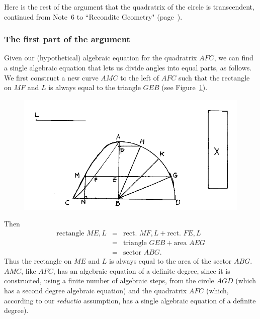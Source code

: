 \documentclass[polutonikogreek,english,twoside,openright]{article}
\begin{document}
Here is the rest of the argument that the quadratrix of the circle is
transcendent, continued from Note~6 to ``Recondite Geometry"
(page~\pageref{crg6}).

\subsubsection*{The first part of the argument}

Given our (hypothetical) algebraic equation for the quadratrix $AFC$,
we can find a single algebraic equation that lets us divide angles
into equal parts, as follows.  We first construct a new curve $AMC$ to
the left of $AFC$ such that the rectangle on $MF$ and $L$ is always
equal to the triangle $GEB$ (see Figure~\ref{circquad3}).
\begin{figure}[ht]
  \begin{center}
    \includegraphics[width=\textwidth]{fig/Figure32}
    \caption{}
    \label{circquad3}
    \vspace{-10pt}
  \end{center}
\end{figure}

Then
\begin{eqnarray*}
  \mbox{rectangle }ME,L & = & \mbox{rect.\ }MF,L + \mbox{rect.\ }FE,L\\
                        & = & \mbox{triangle }GEB + \mbox{area }AEG\\
                        & = & \mbox{sector }ABG.
\end{eqnarray*}
Thus the rectangle on $ME$ and $L$ is always equal to the area of the
sector $ABG$.  $AMC$, like $AFC$, has an algebraic equation of a
definite degree, since it is constructed, using a finite number of
algebraic steps, from the circle $AGD$ (which has a second degree
algebraic equation) and the quadratrix $AFC$ (which, according to our
{\em reductio} assumption, has a single algebraic equation of a
definite degree).
\end{document}
